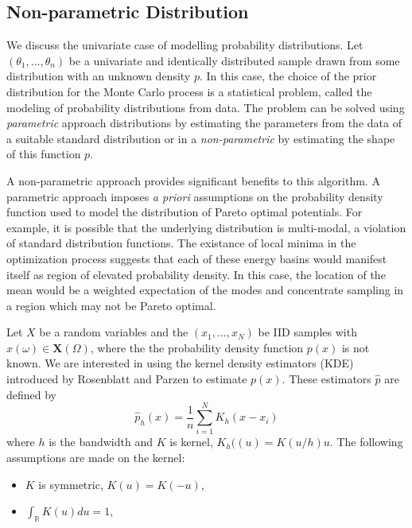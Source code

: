 \subsection{Non-parametric Distribution}
We discuss the univariate case of modelling probability distributions.
Let $(\theta_1,...,\theta_n)$ be a univariate and identically distributed sample drawn from some distribution with an unknown density $p$.
In this case, the choice of the prior distribution for the Monte Carlo process is a statistical problem, called the modeling of probability distributions from data.  The problem can be solved using \emph{parametric} approach distributions by estimating the parameters from the data of a suitable standard distribution or in a \emph{non-parametric} by estimating the shape of this function $p$.

A non-parametric approach provides significant benefits to this algorithm.  A parametric approach imposes \emph{a priori} assumptions on the probability density function used to model the distribution of Pareto optimal potentials.  For example, it is possible that the underlying distribution is multi-modal, a violation of standard distribution functions.  The existance of local minima in the optimization process suggests that each of these energy basins would manifest itself as region of elevated probability density.  In this case, the location of the mean would be a weighted expectation of the modes and concentrate sampling in a region which may not be Pareto optimal.


Let $X$ be a random variables and the $(x_1,...,x_N)$ be IID samples with $x(\omega) \in \bm{X}(\Omega)$, where the the probability density function $p(x)$ is not known.  We are interested in using the kernel density estimators (KDE) introduced by Rosenblatt\cite{rosenblatt1956_kde} and Parzen\cite{parzen1962_kde} to estimate $p(x)$.   These estimators $\hat{p}$ are defined by
\begin{equation}
\label{eq:kde}
    \hat{p}_h(x) = \frac{1}{n} \sum_{i=1}^N K_h(x-x_i)
\end{equation}
where $h$ is the bandwidth and $K$ is kernel, $K_h((u)=K(u/h)u$.  The following assumptions are made on the kernel:
\begin{itemize}
    \item $K$ is symmetric, $K(u)=K(-u)$,
    \item $\int_\mathbb{R} K(u)du = 1$,
\end{itemize}

